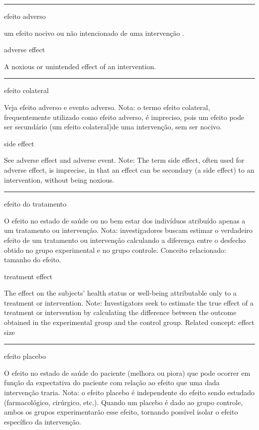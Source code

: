 \documentclass[
  openany]{book}
\begin{document}
\begin{center}\rule{0.5\linewidth}{0.5pt}\end{center}

efeito adverso

um efeito nocivo ou não intencionado de uma intervenção .

adverse effect

A noxious or unintended effect of an intervention.

\begin{center}\rule{0.5\linewidth}{0.5pt}\end{center}

efeito colateral

Veja efeito adverso e evento adverso. Nota: o termo efeito colateral, frequentemente utilizado como efeito adverso, é impreciso, pois um efeito pode ser secundário (um efeito colateral)de uma intervenção, sem ser nocivo.

side effect

See adverse effect and adverse event. Note: The term side effect, often used for adverse effect, is imprecise, in that an effect can be secondary (a side effect) to an intervention, without being noxious.

\begin{center}\rule{0.5\linewidth}{0.5pt}\end{center}

efeito do tratamento

O efeito no estado de saúde ou no bem estar dos indivíduos atribuído apenas a um tratamento ou intervenção. Nota: investigadores buscam estimar o verdadeiro efeito de um tratamento ou intervenção calculando a diferença entre o desfecho obtido no grupo experimental e no grupo controle. Conceito relacionado: tamanho do efeito.

treatment effect

The effect on the subjects' health status or well-being attributable only to a treatment or intervention. Note: Investigators seek to estimate the true effect of a treatment or intervention by calculating the difference between the outcome obtained in the experimental group and the control group.
Related concept: effect size

\begin{center}\rule{0.5\linewidth}{0.5pt}\end{center}

efeito placebo

O efeito no estado de saúde do paciente (melhora ou piora) que pode ocorrer em função da expectativa do paciente com relação ao efeito que uma dada intervenção traria. Nota: o efeito placebo é independente do efeito sendo estudado (farmacológico, cirúrgico, etc.). Quando um placebo é dado ao grupo controle, ambos os grupos experimentarão esse efeito, tornando possível isolar o efeito específico da intervenção.
\end{document}
